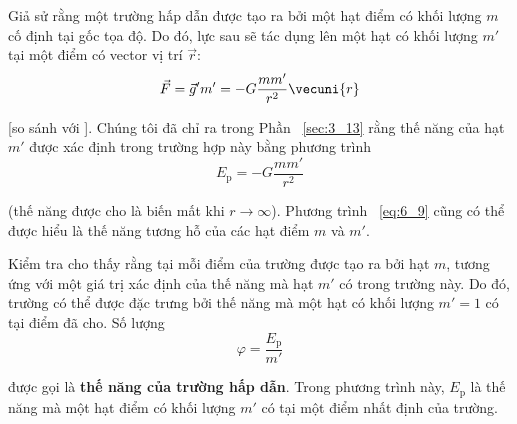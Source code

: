 Giả sử rằng một trường hấp dẫn được tạo ra bởi một hạt điểm có khối lượng $m$ cố định tại gốc tọa độ. Do đó, lực sau sẽ tác dụng lên một hạt có khối lượng $m'$ tại một điểm có vector vị trí $\vec{r}$:
\begin{equation}\label{eq:6_8}
	\vec{F} = \vec{g}'m' = -G\frac{mm'}{r^2}\vecuni{r}
\end{equation}

\noindent
[so sánh với ]. Chúng tôi đã chỉ ra trong Phần ~\ref{sec:3_13} rằng thế năng của hạt $m'$ được xác định trong trường hợp này bằng phương trình
\begin{equation}\label{eq:6_9}
	E_{\text{p}} = -G\frac{mm'}{r^2}
\end{equation}

\noindent
(thế năng được cho là biến mất khi $r\to\infty$). Phương trình ~\eqref{eq:6_9} cũng có thể được hiểu là thế năng tương hỗ của các hạt điểm $m$ và $m'$.

Kiểm tra  cho thấy rằng tại mỗi điểm của trường được tạo ra bởi hạt $m$, tương ứng với một giá trị xác định của thế năng mà hạt $m'$ có trong trường này. Do đó, trường có thể được đặc trưng bởi thế năng mà một hạt có khối lượng $m'=1$ có tại điểm đã cho. Số lượng
\begin{equation}\label{eq:6_10}
	\varphi = \frac{E_{\text{p}}}{m'}
\end{equation}

\noindent
được gọi là \textbf{thế năng của trường hấp dẫn}. Trong phương trình này, $E_{\text{p}}$ là thế năng mà một hạt điểm có khối lượng $m'$ có tại một điểm nhất định của trường.

